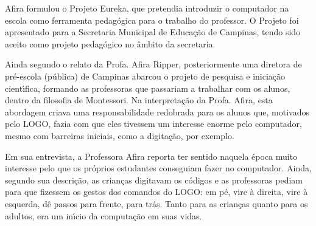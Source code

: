 \documentclass[
12pt,		%
openright,	%
twoside,  %
a4paper,			%
chapter=TITLE,		%
english,			%
french,				%
spanish,			%
brazil				%
]{USPSC-classe/USPSC}
\begin{document}
Afira formulou o Projeto Eureka, que pretendia introduzir o computador na escola como ferramenta pedag\'ogica para o trabalho do professor. O Projeto foi apresentado para a Secretaria Municipal de Educa\c{c}\~ao de Campinas, tendo sido aceito como projeto pedag\'ogico no \^ambito da secretaria.

















Ainda segundo o relato da Profa. Afira Ripper, posteriormente uma diretora de pr\'e-escola (p\'ublica) de Campinas abarcou o projeto de pesquisa e inicia\c{c}\~ao cient\'{\i}fica, formando as professoras que passariam a trabalhar com os alunos, dentro da filosofia de Montessori. Na interpreta\c{c}\~ao da Profa. Afira, esta abordagem criava uma responsabilidade redobrada para os alunos que, motivados pelo LOGO, fazia com que eles tivessem um interesse enorme pelo computador, mesmo com barreiras iniciais, como a digita\c{c}\~ao, por exemplo.

















Em sua entrevista, a Professora Afira reporta ter sentido naquela \'epoca muito interesse pelo que os pr\'oprios estudantes conseguiam fazer no computador. Ainda, segundo sua descri\c{c}\~ao, as crian\c{c}as digitavam os c\'odigos e as professoras pediam para que fizessem os gestos dos comandos do LOGO: \textquotedbl em p\'e\textquotedbl , \textquotedbl vire \`a direita\textquotedbl , \textquotedbl vire \`a esquerda\textquotedbl , \textquotedbl d\^e passos para frente\textquotedbl , \textquotedbl para tr\'as\textquotedbl . Tanto para as crian\c{c}as quanto para os adultos, era um in\'{\i}cio da computa\c{c}\~ao em suas vidas.
\end{document}
